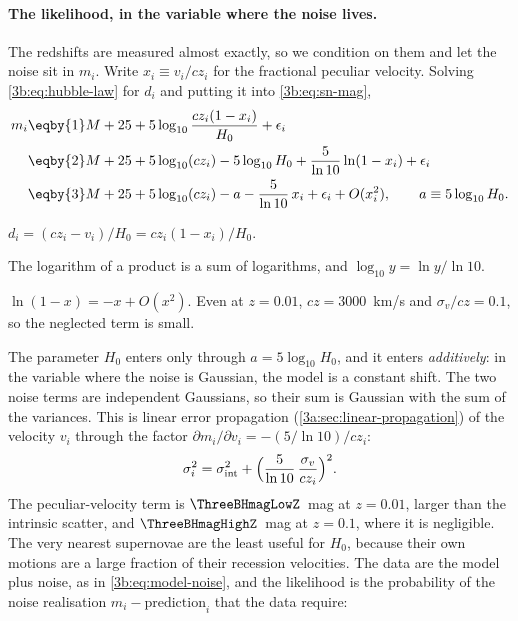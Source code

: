\paragraph{The likelihood, in the variable where the noise lives.}
The redshifts are measured almost exactly, so we condition on them and let
the noise sit in $m_i$. Write $x_i\equiv v_i/cz_i$ for the fractional
peculiar velocity. Solving \eqref{3b:eq:hubble-law} for $d_i$ and putting it
into \eqref{3b:eq:sn-mag},
\begin{align}
  m_i&\eqby{1}M+25+5\log_{10}\frac{cz_i(1-x_i)}{H_0}+\epsilon_i\nonumber\\
     &\eqby{2}M+25+5\log_{10}(cz_i)-5\log_{10}H_0+\frac{5}{\ln10}\ln(1-x_i)+\epsilon_i\nonumber\\
     &\eqby{3}M+25+5\log_{10}(cz_i)-a-\frac{5}{\ln10}\,x_i+\epsilon_i+O(x_i^2),
     \qquad a\equiv5\log_{10}H_0 .
  \label{3b:eq:sn-model}
\end{align}
\begin{explain}
  \item $d_i=(cz_i-v_i)/H_0=cz_i(1-x_i)/H_0$.
  \item The logarithm of a product is a sum of logarithms, and
        $\log_{10}y=\ln y/\ln10$.
  \item $\ln(1-x)=-x+O(x^2)$. Even at $z=0.01$, $cz=3000$~km/s and
        $\sigma_v/cz=0.1$, so the neglected term is small.
\end{explain}
The parameter $H_0$ enters only through $a=5\log_{10}H_0$, and it enters
\emph{additively}: in the variable where the noise is Gaussian, the model is
a constant shift. The two noise terms are independent Gaussians, so their sum
is Gaussian with the sum of the variances. This is linear error propagation
(\cref{3a:sec:linear-propagation}) of the velocity $v_i$ through the factor
$\partial m_i/\partial v_i=-(5/\ln10)/cz_i$:
\begin{equation}
  \sigma_i^2=\sigma_{\rm int}^2+\Bigl(\frac{5}{\ln10}\,\frac{\sigma_v}{cz_i}\Bigr)^2 .
  \label{3b:eq:sn-sigma}
\end{equation}
The peculiar-velocity term is $\ThreeBHmagLowZ$~mag at $z=0.01$, larger than the
intrinsic scatter, and $\ThreeBHmagHighZ$~mag at $z=0.1$, where it is
negligible. The very nearest supernovae are the least useful for $H_0$,
because their own motions are a large fraction of their recession
velocities. The data are the model plus noise, as in
\eqref{3b:eq:model-noise}, and the likelihood is the probability of the noise
realisation $m_i-\text{prediction}_i$ that the data require:
